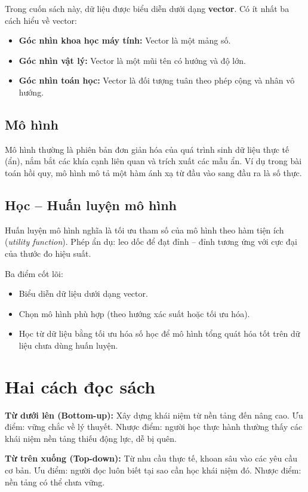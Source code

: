 \documentclass[12pt,a4paper]{article}
\begin{document}
Trong cuốn sách này, dữ liệu được biểu diễn dưới dạng \textbf{vector}. Có ít nhất ba cách hiểu về vector:
\begin{itemize}
  \item \textbf{Góc nhìn khoa học máy tính:} Vector là một mảng số.
  \item \textbf{Góc nhìn vật lý:} Vector là một mũi tên có hướng và độ lớn.
  \item \textbf{Góc nhìn toán học:} Vector là đối tượng tuân theo phép cộng và nhân vô hướng.
\end{itemize}

\subsection{Mô hình}

Mô hình thường là phiên bản đơn giản hóa của quá trình sinh dữ liệu thực tế (ẩn), nắm bắt các khía cạnh liên quan và trích xuất các mẫu ẩn. Ví dụ trong bài toán hồi quy, mô hình mô tả một hàm ánh xạ từ đầu vào sang đầu ra là số thực.

\subsection{Học -- Huấn luyện mô hình}

Huấn luyện mô hình nghĩa là tối ưu tham số của mô hình theo hàm tiện ích (\emph{utility function}). Phép ẩn dụ: leo dốc để đạt đỉnh -- đỉnh tương ứng với cực đại của thước đo hiệu suất.

\begin{tomtatbox}
Ba điểm cốt lõi:
\begin{itemize}
  \item Biểu diễn dữ liệu dưới dạng vector.
  \item Chọn mô hình phù hợp (theo hướng xác suất hoặc tối ưu hóa).
  \item Học từ dữ liệu bằng tối ưu hóa số học để mô hình tổng quát hóa tốt trên dữ liệu chưa dùng huấn luyện.
\end{itemize}
\end{tomtatbox}

\section{Hai cách đọc sách}

\begin{khainiembox}
\textbf{Từ dưới lên (Bottom-up):} Xây dựng khái niệm từ nền tảng đến nâng cao. Ưu điểm: vững chắc về lý thuyết. Nhược điểm: người học thực hành thường thấy các khái niệm nền tảng thiếu động lực, dễ bị quên.

\textbf{Từ trên xuống (Top-down):} Từ nhu cầu thực tế, khoan sâu vào các yêu cầu cơ bản. Ưu điểm: người đọc luôn biết tại sao cần học khái niệm đó. Nhược điểm: nền tảng có thể chưa vững.
\end{khainiembox}
\end{document}
